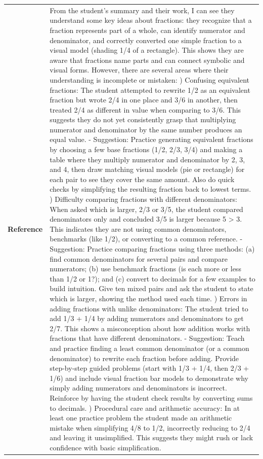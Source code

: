 \begin{longtable}{@{}l p{13cm}@{}}
  \textbf{Reference} & From the student's summary and their work, I can see they understand some key ideas about fractions: they recognize that a fraction represents part of a whole, can identify numerator and denominator, and correctly converted one simple fraction to a visual model (shading 1/4 of a rectangle). This shows they are aware that fractions name parts and can connect symbolic and visual forms. \newline However, there are several areas where their understanding is incomplete or mistaken: \newline 1) Confusing equivalent fractions: The student attempted to rewrite 1/2 as an equivalent fraction but wrote 2/4 in one place and 3/6 in another, then treated 2/4 as different in value when comparing to 3/6. This suggests they do not yet consistently grasp that multiplying numerator and denominator by the same number produces an equal value. \newline - Suggestion: Practice generating equivalent fractions by choosing a few base fractions (1/2, 2/3, 3/4) and making a table where they multiply numerator and denominator by 2, 3, and 4, then draw matching visual models (pie or rectangle) for each pair to see they cover the same amount. Also do quick checks by simplifying the resulting fraction back to lowest terms. \newline 2) Difficulty comparing fractions with different denominators: When asked which is larger, 2/3 or 3/5, the student compared denominators only and concluded 3/5 is larger because 5 \textgreater{} 3. This indicates they are not using common denominators, benchmarks (like 1/2), or converting to a common reference. \newline - Suggestion: Practice comparing fractions using three methods: (a) find common denominators for several pairs and compare numerators; (b) use benchmark fractions (is each more or less than 1/2 or 1?); and (c) convert to decimals for a few examples to build intuition. Give ten mixed pairs and ask the student to state which is larger, showing the method used each time. \newline 3) Errors in adding fractions with unlike denominators: The student tried to add 1/3 + 1/4 by adding numerators and denominators to get 2/7. This shows a misconception about how addition works with fractions that have different denominators. \newline - Suggestion: Teach and practice finding a least common denominator (or a common denominator) to rewrite each fraction before adding. Provide step-by-step guided problems (start with 1/3 + 1/4, then 2/3 + 1/6) and include visual fraction bar models to demonstrate why simply adding numerators and denominators is incorrect. Reinforce by having the student check results by converting sums to decimals. \newline 4) Procedural care and arithmetic accuracy: In at least one practice problem the student made an arithmetic mistake when simplifying 4/8 to 1/2, incorrectly reducing to 2/4 and leaving it unsimplified. This suggests they might rush or lack confidence with basic simplification. \newline 
\end{longtable}

